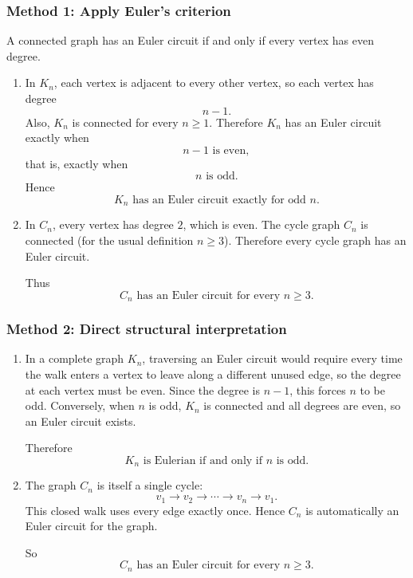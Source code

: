 \documentclass[12pt]{article}
\begin{document}
\subsubsection{Method 1: Apply Euler's criterion}
A connected graph has an Euler circuit if and only if every vertex has even degree.

\begin{enumerate}[label=(\alph*)]
\item In \(K_n\), each vertex is adjacent to every other vertex, so each vertex has degree
\[
n-1.
\]
Also, \(K_n\) is connected for every \(n\ge 1\). Therefore \(K_n\) has an Euler circuit exactly when
\[
n-1 \text{ is even},
\]
that is, exactly when
\[
n \text{ is odd}.
\]
Hence
\[
\boxed{K_n \text{ has an Euler circuit exactly for odd }n.}
\]

\item In \(C_n\), every vertex has degree \(2\), which is even. The cycle graph \(C_n\) is connected (for the usual definition \(n\ge 3\)). Therefore every cycle graph has an Euler circuit.

Thus
\[
\boxed{C_n \text{ has an Euler circuit for every } n\ge 3.}
\]
\end{enumerate}

\subsubsection{Method 2: Direct structural interpretation}
\begin{enumerate}[label=(\alph*)]
\item In a complete graph \(K_n\), traversing an Euler circuit would require every time the walk enters a vertex to leave along a different unused edge, so the degree at each vertex must be even. Since the degree is \(n-1\), this forces \(n\) to be odd. Conversely, when \(n\) is odd, \(K_n\) is connected and all degrees are even, so an Euler circuit exists.

Therefore
\[
\boxed{K_n \text{ is Eulerian if and only if } n \text{ is odd}.}
\]

\item The graph \(C_n\) is itself a single cycle:
\[
v_1\to v_2\to \cdots \to v_n\to v_1.
\]
This closed walk uses every edge exactly once. Hence \(C_n\) is automatically an Euler circuit for the graph.

So
\[
\boxed{C_n \text{ has an Euler circuit for every } n\ge 3.}
\]
\end{enumerate}

\newpage
\end{document}
